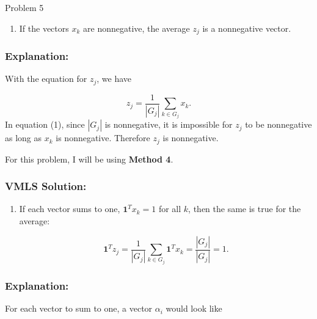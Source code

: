 \begin{problem}{Problem 5}
\begin{highlight}
        \begin{enumerate}[label = (\alph*), start = 1]
            \item If the vectors $x_{k}$ are nonnegative, the average $z_{j}$ is a nonnegative vector.
        \end{enumerate}

        \subsubsection*{Explanation:}

        With the equation for $z_{j}$, we have 
        
        \setcounter{equation}{0}
        \begin{equation}
            z_{j} = \frac{1}{|G_{j}|} \sum_{k \in G_{j}} x_{k}.
        \end{equation}
        In equation (1), since $|G_{j}|$ is nonnegative, it is impossible for $z_{j}$ to be nonnegative as long as $x_{k}$ is nonnegative. Therefore $z_{j}$ is nonnegative.
    \end{highlight}

    \begin{highlight}
        \noindent For this problem, I will be using \textbf{Method 4}. 

        \subsubsection*{VMLS Solution:}

        \begin{enumerate}[label = (\alph*), start = 2]
            \item If each vector sums to one, $\mathbf{1}^{T}x_{k} = 1$ for all $k$, then the same is true for the average:
            
            \begin{equation*}
                \mathbf{1}^{T}z_{j} = \frac{1}{|G_{j}|} \sum_{k \in G_{j}} \mathbf{1}^{T}x_{k} = \frac{|G_{j}|}{|G_{j}|} = 1.
            \end{equation*}
        \end{enumerate}

        \subsubsection*{Explanation:}

        For each vector to sum to one, a vector $\alpha_{i}$ would look like


\end{highlight}
\end{problem}
